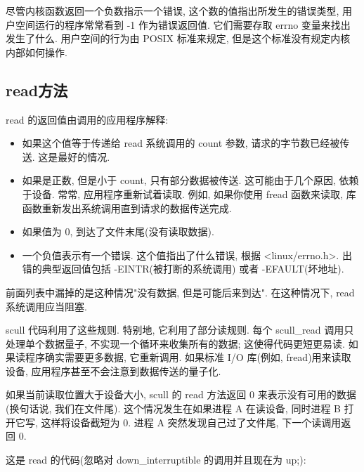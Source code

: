 \documentclass[lang=cn,newtx,10pt,scheme=chinese]{elegantbook}
\begin{document}
尽管内核函数返回一个负数指示一个错误, 这个数的值指出所发生的错误类型, 用户空间运行的程序常常看到 -1 作为错误返回值. 它们需要存取 errno 变量来找出发生了什么. 用户空间的行为由 POSIX 标准来规定, 但是这个标准没有规定内核内部如何操作.

\subsection{read方法}

read 的返回值由调用的应用程序解释:

\begin{itemize}
\item 如果这个值等于传递给 read 系统调用的 count 参数, 请求的字节数已经被传送. 这是最好的情况.
\item 如果是正数, 但是小于 count, 只有部分数据被传送. 这可能由于几个原因, 依赖于设备. 常常, 应用程序重新试着读取. 例如, 如果你使用 fread 函数来读取, 库函数重新发出系统调用直到请求的数据传送完成.
\item 如果值为 0, 到达了文件末尾(没有读取数据).
\item 一个负值表示有一个错误. 这个值指出了什么错误, 根据 <linux/errno.h>. 出错的典型返回值包括 -EINTR(被打断的系统调用) 或者 -EFAULT(坏地址).
\end{itemize}

前面列表中漏掉的是这种情况"没有数据, 但是可能后来到达". 在这种情况下, read 系统调用应当阻塞.

scull 代码利用了这些规则. 特别地, 它利用了部分读规则. 每个 scull\_read 调用只处理单个数据量子, 不实现一个循环来收集所有的数据; 这使得代码更短更易读. 如果读程序确实需要更多数据, 它重新调用. 如果标准 I/O 库(例如, fread)用来读取设备, 应用程序甚至不会注意到数据传送的量子化.

如果当前读取位置大于设备大小, scull 的 read 方法返回 0 来表示没有可用的数据(换句话说, 我们在文件尾). 这个情况发生在如果进程 A 在读设备, 同时进程 B 打开它写, 这样将设备截短为 0. 进程 A 突然发现自己过了文件尾, 下一个读调用返回 0.

这是 read 的代码(忽略对 down\_interruptible 的调用并且现在为 up;):
\end{document}
